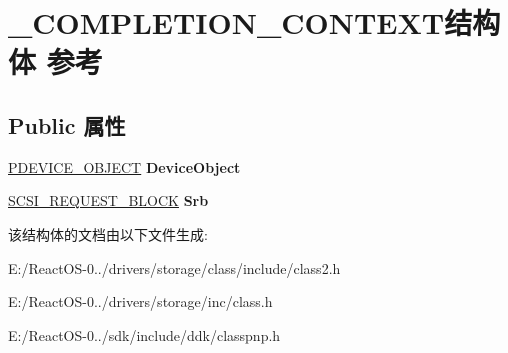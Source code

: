 \hypertarget{struct___c_o_m_p_l_e_t_i_o_n___c_o_n_t_e_x_t}{}\section{\+\_\+\+C\+O\+M\+P\+L\+E\+T\+I\+O\+N\+\_\+\+C\+O\+N\+T\+E\+X\+T结构体 参考}
\label{struct___c_o_m_p_l_e_t_i_o_n___c_o_n_t_e_x_t}
\subsection*{Public 属性}
\begin{DoxyCompactItemize}
\item 
\mbox{\label{struct___c_o_m_p_l_e_t_i_o_n___c_o_n_t_e_x_t_aa7bfe0b802f8c2d2963609a803644ba1}} 
\hyperlink{struct___d_e_v_i_c_e___o_b_j_e_c_t}{P\+D\+E\+V\+I\+C\+E\+\_\+\+O\+B\+J\+E\+CT} {\bfseries Device\+Object}
\item 
\mbox{\label{struct___c_o_m_p_l_e_t_i_o_n___c_o_n_t_e_x_t_a690f2368fb51ef0a14d8a7ec7ab3440f}} 
\hyperlink{struct___s_c_s_i___r_e_q_u_e_s_t___b_l_o_c_k}{S\+C\+S\+I\+\_\+\+R\+E\+Q\+U\+E\+S\+T\+\_\+\+B\+L\+O\+CK} {\bfseries Srb}
\end{DoxyCompactItemize}


该结构体的文档由以下文件生成\+:\begin{DoxyCompactItemize}
\item 
E\+:/\+React\+O\+S-\/0../drivers/storage/class/include/class2.\+h\item 
E\+:/\+React\+O\+S-\/0../drivers/storage/inc/class.\+h\item 
E\+:/\+React\+O\+S-\/0../sdk/include/ddk/classpnp.\+h\end{DoxyCompactItemize}
